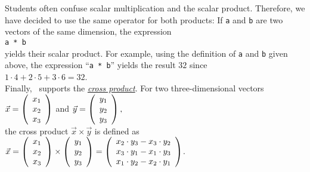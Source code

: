 Students often confuse scalar multiplication and the scalar product.
Therefore, we have decided to use the same operator for both products:
If \texttt{a} and \texttt{b} are two vectors of the same dimension, the expression
\\[0.2cm]
\hspace*{1.3cm}
\texttt{a * b}
\\[0.2cm]
yields their scalar product.  For example,
using the definition of \texttt{a} and \texttt{b} given above, the expression
``\texttt{a * b}''
yields the result $32$ since
\\[0.2cm]
\hspace*{1.3cm}
$1 \cdot 4 + 2 \cdot 5 + 3 \cdot 6 = 32$.
\\[0.2cm]
Finally, \setlx\ supports the 
\href{http://en.wikipedia.org/wiki/Cross_product}{\emph{cross product}}.  For two three-dimensional
vectors 
\\[0.2cm]
\hspace*{1.3cm}
$\vec{x} = \left(
  \begin{array}[c]{c}
  x_1 \\
  x_2 \\
  x_3    
  \end{array}
\right)
$ 
\quad and \quad
$\vec{y} = \left(
  \begin{array}[c]{c}
  y_1 \\
  y_2 \\
  y_3    
  \end{array}
\right),
$ 
\\[0.2cm]
the cross product $\vec{x} \times \vec{y}$ is defined as
\\[0.2cm]
\hspace*{1.3cm}
$\vec{x} = \left(
  \begin{array}[c]{c}
  x_1 \\
  x_2 \\
  x_3    
  \end{array}
\right) \times \left(
  \begin{array}[c]{c}
  y_1 \\
  y_2 \\
  y_3    
  \end{array}
\right) = \left(
  \begin{array}[c]{c}
  x_2 \cdot y_3 - x_3 \cdot y_2 \\
  x_3 \cdot y_1 - x_1 \cdot y_3 \\
  x_1 \cdot y_2 - x_2 \cdot y_1    
  \end{array}
\right)
$. 
\\[0.2cm]
